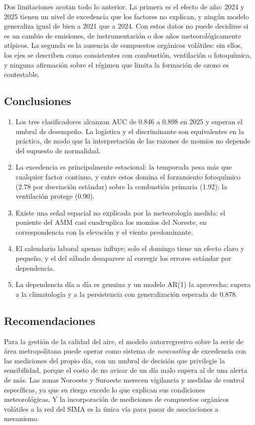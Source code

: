Dos limitaciones acotan todo lo anterior. La primera es el efecto de año:
2024 y 2025 tienen un nivel de excedencia que los factores no explican, y
ningún modelo generaliza igual de bien a 2021 que a 2024. Con estos datos
no puede decidirse si es un cambio de emisiones, de instrumentación o dos
años meteorológicamente atípicos. La segunda es la ausencia de compuestos
orgánicos volátiles: sin ellos, los ejes se describen como consistentes con
combustión, ventilación o fotoquímica, y ninguna afirmación sobre el régimen
que limita la formación de ozono es contestable.

\subsection{Conclusiones}

\begin{enumerate}[label=\roman*.]
  \item Los tres clasificadores alcanzan AUC de 0.846 a 0.898 en 2025 y
    superan el umbral de desempeño. La logística y el discriminante son
    equivalentes en la práctica, de modo que la interpretación de las razones
    de momios no depende del supuesto de normalidad.
  \item La excedencia es principalmente estacional: la temporada pesa más
    que cualquier factor continuo, y entre estos domina el forzamiento
    fotoquímico (2.78 por desviación estándar) sobre la combustión primaria
    (1.92); la ventilación protege (0.90).
  \item Existe una señal espacial no explicada por la meteorología medida:
    el poniente del AMM casi cuadruplica los momios del Noreste, en
    correspondencia con la elevación y el viento predominante.
  \item El calendario laboral apenas influye; solo el domingo tiene un
    efecto claro y pequeño, y el del sábado desaparece al corregir los
    errores estándar por dependencia.
  \item La dependencia día a día es genuina y un modelo AR(1) la aprovecha:
    supera a la climatología y a la persistencia con generalización esperada
    de 0.878.
\end{enumerate}

\subsection{Recomendaciones}

Para la gestión de la calidad del aire, el modelo autorregresivo sobre la
serie de área metropolitana puede operar como sistema de \emph{nowcasting}
de excedencia con las mediciones del propio día, con un umbral de decisión
que privilegie la sensibilidad, porque el costo de no avisar de un día malo
supera al de una alerta de más. Las zonas Noroeste y Suroeste merecen
vigilancia y medidas de control específicas, ya que su riesgo excede lo que
explican sus condiciones meteorológicas. Y la incorporación de mediciones de
compuestos orgánicos volátiles a la red del SIMA es la única vía para pasar
de asociaciones a mecanismo.

